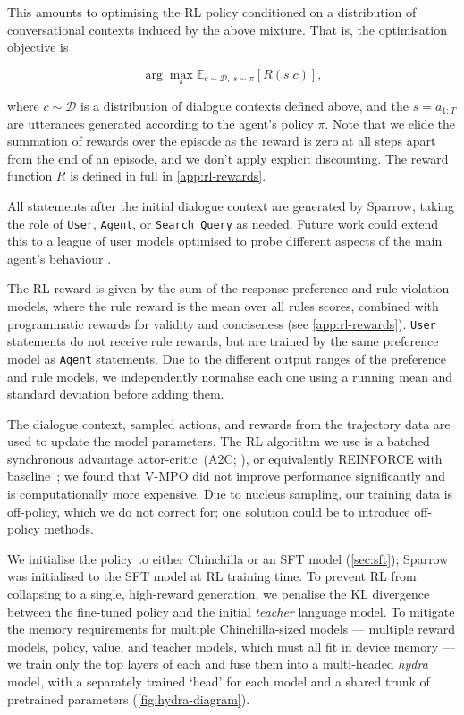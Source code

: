 This amounts to optimising the RL policy conditioned on a distribution of conversational contexts induced by the above mixture. That is, the optimisation objective is

$$
\arg\max_\pi \mathbb{E}_{c\sim \mathcal{D},\ s\sim \pi}\left[R(s\lvert c)\right],
$$

where $c\sim\mathcal{D}$ is a distribution of dialogue contexts defined above, and the $s = a_{1:T}$ are utterances generated according to the agent's policy $\pi$. Note that we elide the summation of rewards over the episode as the reward is zero at all steps apart from the end of an episode, and we don't apply explicit discounting. The reward function $R$ is defined in full in \ref{app:rl-rewards}.

All statements after the initial dialogue context are generated by Sparrow, taking the role of \texttt{User}, \texttt{Agent}, or \texttt{Search Query} as needed. Future work could extend this to a league of user models optimised to probe different aspects of the main agent's behaviour \citep{alphastar}.

The RL reward is given by the sum of the response preference and rule violation models, where the rule reward is the mean over all rules scores, combined with programmatic rewards for validity and conciseness (see \ref{app:rl-rewards}). \texttt{User} statements do not receive rule rewards, but are trained by the same preference model as \texttt{Agent} statements. Due to the different output ranges of the preference and rule models, we independently normalise each one using a running mean and standard deviation before adding them.

The dialogue context, sampled actions, and rewards from the trajectory data are used to update the model parameters. The RL algorithm we use is a batched synchronous advantage actor-critic~(A2C; \cite{mnih2016a3c}), or equivalently REINFORCE with baseline~\citep{Sutton1998}; we found that V-MPO \citep{song2019v} did not improve performance significantly and is computationally more expensive. Due to nucleus sampling, our training data is off-policy, which we do not correct for; one solution could be to introduce off-policy methods.

We initialise the policy to either Chinchilla or an SFT model (\ref{sec:sft}); Sparrow was initialised to the SFT model at RL training time. To prevent RL from collapsing to a single, high-reward generation, we penalise the KL divergence between the fine-tuned policy and the initial \emph{teacher} language model. To mitigate the memory requirements for multiple Chinchilla-sized models --- multiple reward models, policy, value, and teacher models,  which must all fit in device memory --- we train only the top layers of each and fuse them into a multi-headed \emph{hydra} model, with a separately trained `head' for each model and a shared trunk of pretrained parameters (\ref{fig:hydra-diagram}).

